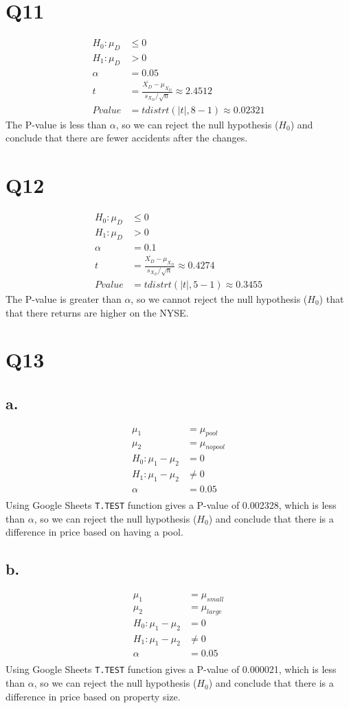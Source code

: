 \documentclass[11pt,a4paper]{article}
\begin{document}
\section*{Q11}
\begin{align*}
H_0: \mu_D &\leq 0 \\
H_1: \mu_D &> 0 \\
\alpha &= 0.05 \\
t &= \frac{\overline{X_D}-\mu_{\overline{X_D}}}{s_{X_D} / \sqrt{n}} \approx 2.4512 \\
Pvalue &= tdistrt(|t|, 8-1) \approx 0.02321
\end{align*}
The P-value is less than $\alpha$, so we can reject the null hypothesis ($H_0$) and conclude
that there are fewer accidents after the changes.
\section*{Q12}
\begin{align*}
H_0: \mu_D &\leq 0 \\
H_1: \mu_D &> 0 \\
\alpha &= 0.1 \\
t &= \frac{\overline{X_D}-\mu_{\overline{X_D}}}{s_{X_D} / \sqrt{n}} \approx 0.4274 \\
Pvalue &= tdistrt(|t|, 5-1) \approx 0.3455
\end{align*}
The P-value is greater than $\alpha$, so we cannot reject the null hypothesis ($H_0$) that that there returns are higher on the NYSE.
\section*{Q13}
\subsection*{a.}
\begin{align*}
\mu_1 &= \mu_{pool} \\
\mu_2 &= \mu_{nopool} \\
H_0: \mu_1 - \mu_2 &= 0 \\
H_1: \mu_1 - \mu_2 &\neq 0 \\
\alpha &= 0.05 \\
\end{align*}
Using Google Sheets \texttt{T.TEST} function gives a P-value of 0.002328,	which is less than
$\alpha$, so we can reject the null hypothesis ($H_0$) and conclude that there is a difference
in price based on having a pool.
\subsection*{b.}
\begin{align*}
\mu_1 &= \mu_{small} \\
\mu_2 &= \mu_{large} \\
H_0: \mu_1 - \mu_2 &= 0 \\
H_1: \mu_1 - \mu_2 &\neq 0 \\
\alpha &= 0.05 \\
\end{align*}
Using Google Sheets \texttt{T.TEST} function gives a P-value of 0.000021,	which is less than
$\alpha$, so we can reject the null hypothesis ($H_0$) and conclude that there is a difference
in price based on property size.
\end{document}

